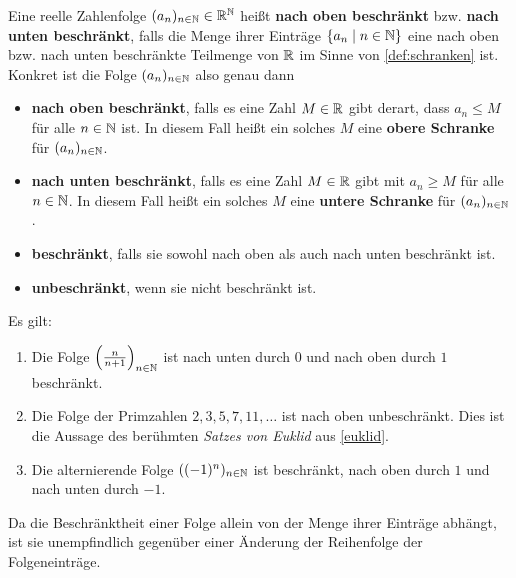 \begin{defin}[Beschränktheit] 
    Eine reelle Zahlenfolge $(a_n)_{n\in \mathbb N}\in \mathbb R^\mathbb N$ heißt \textbf{nach oben beschränkt} bzw. \textbf{nach unten beschränkt}, falls die Menge ihrer Einträge $\{a_n\mid n\in \mathbb N\}$ eine nach oben bzw. nach unten beschränkte Teilmenge von $\mathbb R$ im Sinne von \cref{def:schranken} ist. Konkret ist die Folge $(a_n)_{n\in \mathbb N}$ also genau dann
    \begin{itemize}
        \item \textbf{nach oben beschränkt}, falls es eine Zahl $M\in \mathbb R$ gibt derart, dass $a_n\le M$ für alle $n\in \mathbb N$ ist. In diesem Fall heißt ein solches $M$ eine \textbf{obere Schranke} für $(a_n)_{n\in \mathbb N}$.
        \item \textbf{nach unten beschränkt}, falls es eine Zahl $M\in \mathbb R$ gibt mit $a_n\ge M$ für alle $n\in \mathbb N$. In diesem Fall heißt ein solches $M$ eine \textbf{untere Schranke} für $(a_n)_{n\in \mathbb N}$.
        \item \textbf{beschränkt}, falls sie sowohl nach oben als auch nach unten beschränkt ist.
        \item \textbf{unbeschränkt}, wenn sie nicht beschränkt ist.
    \end{itemize}
\end{defin}


\begin{bsp} Es gilt:
    \begin{enumerate}
        \item Die Folge $\left(\frac{n}{n+1}\right)_{n\in \mathbb N}$ ist nach unten durch $0$ und nach oben durch $1$ beschränkt.
        \item Die Folge der Primzahlen $2,3,5,7,11,\dots$ ist nach oben unbeschränkt. Dies ist die Aussage des berühmten \emph{Satzes von Euklid} aus \cref{euklid}.
        \item Die alternierende Folge $((-1)^n)_{n\in \mathbb N}$ ist beschränkt, nach oben durch $1$ und nach unten durch $-1$.
    \end{enumerate}
    Da die Beschränktheit einer Folge allein von der Menge ihrer Einträge abhängt, ist sie unempfindlich gegenüber einer Änderung der Reihenfolge der Folgeneinträge.
\end{bsp}


